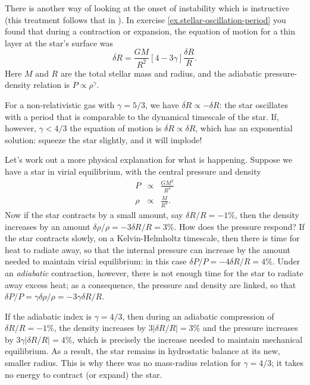 \begin{sidebar}
There is another way of looking at the onset of instability which is instructive (this treatment follows that in \citet{Cox1980Theory-of-Stell}). In exercise \ref{ex.stellar-oscillation-period} you found that during a contraction or expansion, the equation of motion for a thin layer at the star's surface was
\[
	\ddot{\delta R} = \frac{GM}{R^{2}}\left[4-3\gamma\right]\frac{\delta R}{R}.
\]
Here $M$ and $R$ are the total stellar mass and radius, and the adiabatic pressure-density relation is $P\propto \rho^{\gamma}$.

For a non-relativistic gas with $\gamma = 5/3$, we have $\ddot{\delta R} \propto -\delta R$: the star oscillates with a period that is comparable to the dynamical timescale of the star. If, however, $\gamma < 4/3$ the equation of motion is $\ddot{\delta R} \propto \delta R$, which has an exponential solution: squeeze the star slightly, and it will implode!

Let's work out a more physical explanation for what is happening. Suppose we have a star in virial equilibrium, with the central pressure and density
\begin{eqnarray*}
P &\propto& \frac{GM^{2}}{R^{4}} \\
\rho &\propto& \frac{M}{R^{3}}.
\end{eqnarray*}
Now if the star contracts by a small amount, say $\delta R/R = -1\%$, then the density increases by an amount $\delta\rho/\rho = -3\delta R/R = 3\%$. How does the pressure respond? If the star contracts slowly, on a Kelvin-Helmholtz timescale, then there is time for heat to radiate away, so that the internal pressure can increase by the amount needed to maintain virial equilibrium: in this case $\delta P/P = -4\delta R/R = 4\%$. Under an \emph{adiabatic} contraction, however, there is not enough time for the star to radiate away excess heat; as a consequence, the pressure and density are linked, so that $\delta P/P = \gamma\delta \rho/\rho = -3\gamma\delta R/R$.

If the adiabatic index is $\gamma = 4/3$, then during an adiabatic compression of $\delta R/R = -1\%$, the density increases by $3|\delta R/R| = 3\%$ and the pressure increases by $3\gamma|\delta R/R| = 4\%$, which is precisely the increase needed to maintain mechanical equilibrium. As a result, the star remains in hydrostatic balance at its new, smaller radius. This is why there was no mass-radius relation for $\gamma = 4/3$; it takes no energy to contract (or expand) the star.


\end{sidebar}
